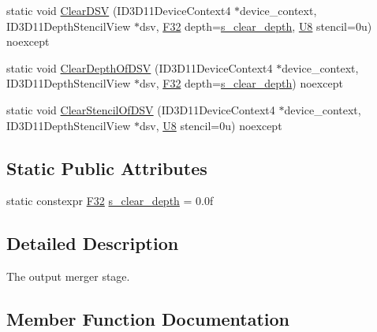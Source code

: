 \begin{DoxyCompactItemize}
static void \hyperlink{structmage_1_1_pipeline_1_1_o_m_a7448e932abce8f98ebe2375d31a457ff}{Clear\+D\+SV} (I\+D3\+D11\+Device\+Context4 $\ast$device\+\_\+context, I\+D3\+D11\+Depth\+Stencil\+View $\ast$dsv, \hyperlink{namespacemage_aa97e833b45f06d60a0a9c4fc22ae02c0}{F32} depth=\hyperlink{structmage_1_1_pipeline_1_1_o_m_a24388e030eff7d28a3b1fb59f3cf57d5}{s\+\_\+clear\+\_\+depth}, \hyperlink{namespacemage_afc638980bc6154f15af5e2d93a0e0ea9}{U8} stencil=0u) noexcept
\item 
static void \hyperlink{structmage_1_1_pipeline_1_1_o_m_abda5e617e00694156a61d0343ae70804}{Clear\+Depth\+Of\+D\+SV} (I\+D3\+D11\+Device\+Context4 $\ast$device\+\_\+context, I\+D3\+D11\+Depth\+Stencil\+View $\ast$dsv, \hyperlink{namespacemage_aa97e833b45f06d60a0a9c4fc22ae02c0}{F32} depth=\hyperlink{structmage_1_1_pipeline_1_1_o_m_a24388e030eff7d28a3b1fb59f3cf57d5}{s\+\_\+clear\+\_\+depth}) noexcept
\item 
static void \hyperlink{structmage_1_1_pipeline_1_1_o_m_a06e1bfe546294e8d3f68de673124d8a4}{Clear\+Stencil\+Of\+D\+SV} (I\+D3\+D11\+Device\+Context4 $\ast$device\+\_\+context, I\+D3\+D11\+Depth\+Stencil\+View $\ast$dsv, \hyperlink{namespacemage_afc638980bc6154f15af5e2d93a0e0ea9}{U8} stencil=0u) noexcept
\end{DoxyCompactItemize}
\subsection*{Static Public Attributes}
\begin{DoxyCompactItemize}
\item 
static constexpr \hyperlink{namespacemage_aa97e833b45f06d60a0a9c4fc22ae02c0}{F32} \hyperlink{structmage_1_1_pipeline_1_1_o_m_a24388e030eff7d28a3b1fb59f3cf57d5}{s\+\_\+clear\+\_\+depth} = 0.\+0f
\end{DoxyCompactItemize}


\subsection{Detailed Description}
The output merger stage. 

\subsection{Member Function Documentation}
\hypertarget{structmage_1_1_pipeline_1_1_o_m_a6f753f497555088423b58dea7689b031}{}\label{structmage_1_1_pipeline_1_1_o_m_a6f753f497555088423b58dea7689b031} 
